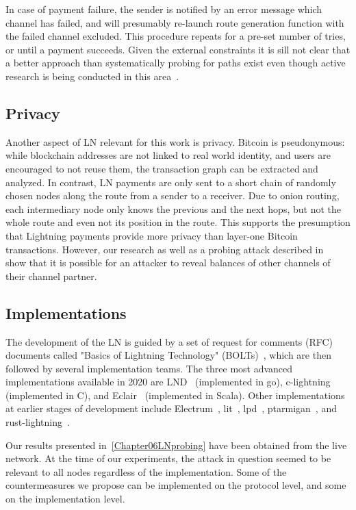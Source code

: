 In case of payment failure, the sender is notified by an error message which channel has failed, and will presumably re-launch route generation function with the failed channel excluded.
This procedure repeats for a pre-set number of tries, or until a payment succeeds.
Given the external constraints it is sill not clear that a better approach than systematically probing for paths exist even though active research is being conducted in this area~\cite{Pickhardt2019a, Prihodko2016, Grunspan2018, Pickhardt2019, Piatkivskyi2018, Sivaraman2018, Bagaria2019, Roos2018}.

\subsection{Privacy}
Another aspect of LN relevant for this work is privacy.
Bitcoin is pseudonymous: while blockchain addresses are not linked to real world identity, and users are encouraged to not reuse them, the transaction graph can be extracted and analyzed.
In contrast, LN payments are only sent to a short chain of randomly chosen nodes along the route from a sender to a receiver.
Due to onion routing, each intermediary node only knows the previous and the next hops, but not the whole route and even not its position in the route.
This supports the presumption that Lightning payments provide more privacy than layer-one Bitcoin transactions.
However, our research as well as a probing attack described in~\cite{Dam2019} show that it is possible for an attacker to reveal balances of other channels of their channel partner.

\subsection{Implementations}
The development of the LN is guided by a set of request for comments (RFC) documents called "Basics of Lightning Technology" (BOLTs)~\cite{BOLT}, 
which are then followed by several implementation teams.
The three most advanced implementations available in 2020 are LND~\cite{LND} (implemented in go), c-lightning~\cite{clightning} (implemented in C), and Eclair~\cite{Eclair} (implemented in Scala).
Other implementations at earlier stages of development include
Electrum~\cite{ElectrumWebsite, ElectrumLightningAnnounce}, lit~\cite{lit}, lpd~\cite{lpd}, ptarmigan~\cite{ptarmigan}, and rust-lightning~\cite{rustlightning}.

Our results presented in~\cref{Chapter06LNprobing} have been obtained from the live network.
At the time of our experiments, the attack in question seemed to be relevant to all nodes regardless of the implementation.
Some of the countermeasures we propose can be implemented on the protocol level, and some on the implementation level.

